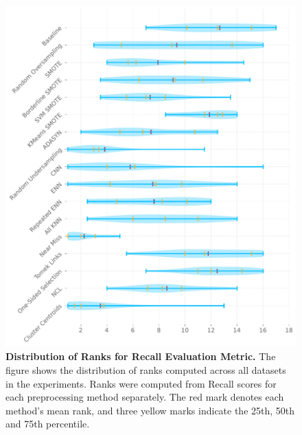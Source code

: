 \begin{figure}
    \centering
    \includegraphics[width=\linewidth]{figures/recall_ranks_distribution.pdf}
    \caption{
        \textbf{Distribution of Ranks for Recall Evaluation Metric.} The figure shows the
        distribution of ranks computed across all datasets in the experiments. Ranks were computed
        from Recall scores for each preprocessing method separately. The red mark denotes each
        method’s mean rank, and three yellow marks indicate the 25th, 50th and 75th percentile.
    }
    \label{figure:recall_rank_distributions}
\end{figure}

